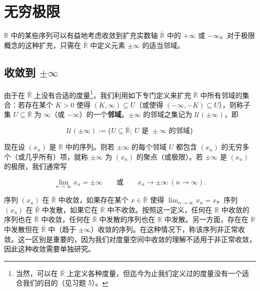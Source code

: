 \section{无穷极限}

$\mathbb{R}$ 中的某些序列可以有益地考虑收敛到扩充实数轴 $\bar{\mathbb{R}}$ 中的 $+\infty$ 或 $-\infty$。对于极限概念的这种扩充，只需在 $\bar{\mathbb{R}}$ 中定义元素 $\pm\infty$ 的适当邻域。

\subsection*{收敛到 $ \pm\infty $}

由于在 $ \bar{\mathbb{R}} $ 上没有合适的度量\footnote{当然，可以在 $\bar{\mathbb R}$ 上定义各种度量，但迄今为止我们定义过的度量没有一个适合我们的目的（见习题 5）。}，我们利用如下专门定义来扩充 $ \mathbb{R} $ 中所有邻域的集合：若存在某个 $ K > 0 $ 使得 $ (K, \infty) \subseteq U $（或使得 $ (-\infty, -K) \subseteq U $），则称子集 $ U \subseteq \bar{\mathbb{R}} $ 为 $ \infty $（或 $ -\infty $）的一个\textbf{邻域}。$ \pm \infty $ 的邻域之集记为 $ \mathcal{U}(\pm \infty) $，即

\[
\mathcal{U}(\pm\infty):=\{U\subseteq\bar{\mathbb{R}};\ U\text{ 是 }\pm\infty\text{ 的邻域}\}
\]

现在设 $(x_n)$ 是 $\mathbb{R}$ 中的序列。则若 $\pm\infty$ 的每个邻域 $U$ 都包含 $(x_n)$ 的无穷多个（或几乎所有）项，就称 $\pm\infty$ 为 $(x_n)$ 的聚点（或极限）。若 $\pm\infty$ 是 $(x_n)$ 的极限，我们通常写

\[
\lim_{n\to\infty}x_{n}=\pm\infty\qquad\text{或}\qquad x_{n}\to\pm\infty\ \left(n\to\infty\right).
\]

序列 $ (x_n) $ 在 $ \bar{\mathbb{R}} $ 中收敛，如果存在某个 $ x \in \bar{\mathbb{R}} $ 使得 $ \lim_{n \to \infty} x_n = x $。序列 $ (x_n) $ 在 $ \bar{\mathbb{R}} $ 中发散，如果它在 $ \bar{\mathbb{R}} $ 中不收敛。按照这一定义，任何在 $ \mathbb{R} $ 中收敛的序列也在 $ \bar{\mathbb{R}} $ 中收敛，任何在 $ \bar{\mathbb{R}} $ 中发散的序列也在 $ \mathbb{R} $ 中发散。另一方面，存在在 $ \mathbb{R} $ 中发散但在 $ \bar{\mathbb{R}} $ 中（趋于 $ \pm\infty $）收敛的序列。在这种情况下，称该序列非正常收敛。这一区别是重要的，因为我们对度量空间中收敛的理解不适用于非正常收敛，因此这种收敛需要单独研究。

